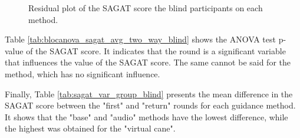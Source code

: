 \begin{figure}[!htb]
\begin{minipage}{0.45\textwidth}
        \caption{Residual plot of the SAGAT score the blind participants on each method.}
        \label{fig:residplot_sagat_avg_two_way_blind}
    \end{minipage}
\end{figure}

Table \ref{tab:blocanova_sagat_avg_two_way_blind} shows the ANOVA test p-value of the SAGAT score. It indicates that the round is a significant variable that influences the value of the SAGAT score. The same cannot be said for the method, which has no significant influence.



Finally, Table \ref{tab:sagat_var_group_blind} presents the mean difference in the SAGAT score between the "first" and "return" rounds for each guidance method. It shows that the "base" and "audio" methods have the lowest difference, while the highest was obtained for the "virtual cane".



\FloatBarrier